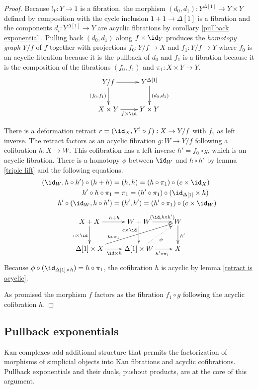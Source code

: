 \documentclass{tac}
\newcommand\bang{!}
\newcommand\of{:}
\newcommand\simplex\Delta
\begin{document}
\begin{proof} Because $\bang_Y\of Y\to 1$ is a fibration, the morphism $(d_0,d_1)\of Y^{\simplex[1]} \to Y\times Y$ defined by composition with the cycle inclusion $1+1\to \simplex[1]$ is a fibration and the components $d_i\of Y^{\simplex[1]}\to Y$ are acyclic fibrations by corollary \ref{pullback exponential}. Pulling back $(d_0,d_1)$ along $f\times \id_Y$ produces the \emph{homotopy graph} $Y/f$ of $f$ together with projections $f_0\of Y/f\to X$ and $f_1\of Y/f\to Y$ where $f_0$ is an acyclic fibration because it is the pullback of $d_0$ and $f_1$ is a fibration because it is the composition of the fibrations $(f_0,f_1)$ and $\pi_1\of X\times Y\to Y$.
\[\xymatrix{
Y/f \ar[r]\ar[d]_{(f_0,f_1)} & Y^{\simplex[1]} \ar[d]^{(d_0,d_1)} \\
X\times Y \ar[r]_{f\times\id} & Y\times Y
}\]

There is a deformation retract $r=(\id_X,Y^\bang\circ f)\of X\to Y/f$ with $f_1$ as left inverse. The retract factors as an acyclic fibration $g\of W\to Y/f$ following a cofibration $h\of X\to W$. This cofibration has a left inverse $h' = f_0\circ g$, which is an acyclic fibration. There is a homotopy $\phi$ between $\id_{W}$ and $h\circ h'$ by lemma \ref{triple lift} and the following equations.
\begin{align*}
(\id_W,h\circ h')\circ(h+h)&=(h,h)= (h\circ\pi_1)\circ (c\times \id_X)\\
h'\circ h\circ \pi_1&=\pi_1=(h'\circ\pi_1)\circ(\id_{\simplex[1]}\times h)\\
h'\circ(\id_W,h\circ h')&=(h',h')= (h'\circ\pi_1)\circ (c\times \id_W)
\end{align*}
\[\xymatrix{
X+X\ar[d]_{c\times \id}\ar[r]^{h+h} & W+W\ar[d]_(.3){c\times \id}\ar[r]^(.6){(\id,h\circ h')} & W\ar[d]^{h'}\\
\simplex[1]\times X\ar[r]_{\id\times h} \ar[urr]^(.3){h\circ\pi_1}  & \simplex[1]\times W\ar[r]_(.6){h'\circ\pi_1} \ar@{.>}[ur]_\phi & X
}\]
Because $\phi\circ(\id_{\simplex[1]\times h}) = h\circ \pi_1$, the cofibration $h$ is acyclic by lemma \ref{retract is acyclic}. 

As promised the morphism $f$ factors as the fibration $f_1\circ g$ following the acyclic cofibration $h$.
\end{proof}


\subsection{Pullback exponentials}
Kan complexes add additional structure that permits the factorization of morphisms of simplicial objects into Kan fibrations and acyclic cofibrations. Pullback exponentials and their duals, pushout products, are at the core of this argument.
\end{document}
